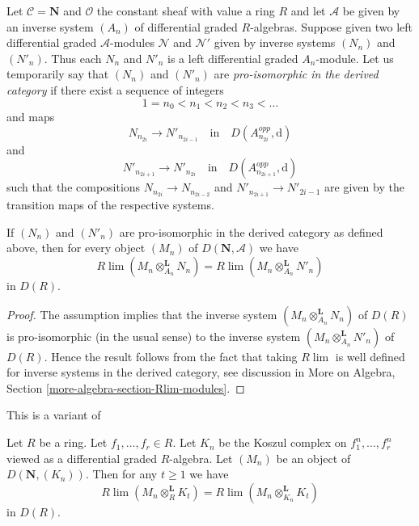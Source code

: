 \noindent
Let $\mathcal{C} = \mathbf{N}$ and $\mathcal{O}$ the constant sheaf
with value a ring $R$ and let $\mathcal{A}$ be given by an inverse
system $(A_n)$ of differential graded $R$-algebras. Suppose given two
left differential graded $\mathcal{A}$-modules $\mathcal{N}$ and
$\mathcal{N}'$ given by inverse systems $(N_n)$ and $(N'_n)$.
Thus each $N_n$ and $N'_n$ is a left differential graded $A_n$-module.
Let us temporarily say that $(N_n)$ and $(N'_n)$ are
{\it pro-isomorphic in the derived category}
if there exist a sequence of integers
$$
1 = n_0 < n_1 < n_2 < n_3 < \ldots
$$
and maps
$$
N_{n_{2i}} \to N'_{n_{2i - 1}}
\quad\text{in}\quad
D(A_{n_{2i}}^{opp}, \text{d})
$$
and
$$
N'_{n_{2i + 1}} \to N'_{n_{2i}}
\quad\text{in}\quad
D(A_{n_{2i + 1}}^{opp}, \text{d})
$$
such that the compositions $N_{n_{2i}} \to N_{n_{2i - 2}}$
and $N'_{n_{2i + 1}} \to N'_{2i - 1}$ are given by the transition
maps of the respective systems.

\begin{lemma}
\label{lemma-pro-isomorphic-systems-tensor}
If $(N_n)$ and $(N'_n)$ are pro-isomorphic in the derived category
as defined above,
then for every object $(M_n)$ of $D(\mathbf{N}, \mathcal{A})$ we have
$$
R\lim (M_n \otimes_{A_n}^\mathbf{L} N_n) =
R\lim (M_n \otimes_{A_n}^\mathbf{L} N'_n)
$$
in $D(R)$.
\end{lemma}

\begin{proof}
The assumption implies that the inverse system
$(M_n \otimes_{A_n}^\mathbf{L} N_n)$ of $D(R)$ is pro-isomorphic
(in the usual sense) to the inverse system
$(M_n \otimes_{A_n}^\mathbf{L} N'_n)$ of $D(R)$. Hence the
result follows from the fact that taking $R\lim$ is well
defined for inverse systems in the derived category, see
discussion in More on Algebra, Section \ref{more-algebra-section-Rlim-modules}.
\end{proof}

\begin{lemma}
\label{lemma-different-tensors}
\begin{reference}
This is a variant of \cite[Lemma 3.5.4]{BS}
\end{reference}
Let $R$ be a ring. Let $f_1, \ldots, f_r \in R$.
Let $K_n$ be the Koszul complex on $f_1^n, \ldots, f_r^n$
viewed as a differential graded $R$-algebra.
Let $(M_n)$ be an object of $D(\mathbf{N}, (K_n))$.
Then for any $t \geq 1$ we have
$$
R\lim (M_n \otimes_R^\mathbf{L} K_t) =
R\lim (M_n \otimes_{K_n}^\mathbf{L} K_t)
$$
in $D(R)$.
\end{lemma}

